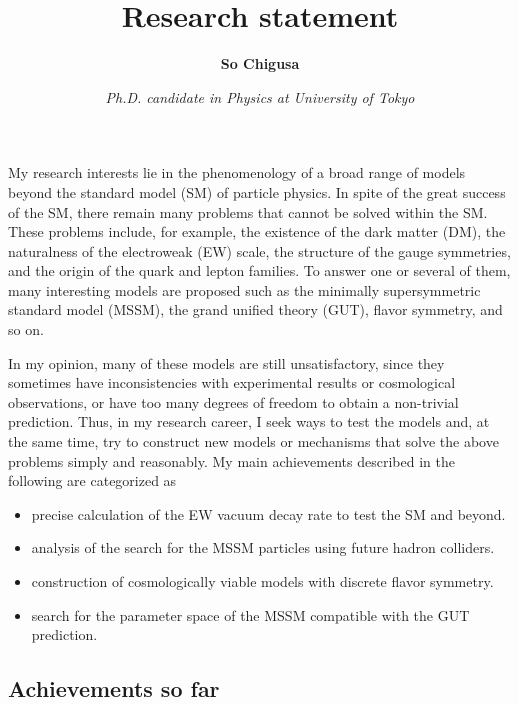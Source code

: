\documentclass[12pt,notitlepage]{article}
\title{\vspace*{-3cm}Research statement}
\author{\textbf{So Chigusa}}
\date{\vspace*{-4mm}\textit{Ph.D. candidate in Physics at University of Tokyo}}
\begin{document}
\maketitle

My research interests lie in the phenomenology of a broad range of models beyond the standard model (SM) of particle physics.
In spite of the great success of the SM, there remain many problems that cannot be solved within the SM.
These problems include, for example, the existence of the dark matter (DM), the naturalness of the electroweak (EW) scale, the structure of the gauge symmetries, and the origin of the quark and lepton families.
To answer one or several of them, many interesting models are proposed such as the minimally supersymmetric standard model (MSSM), the grand unified theory (GUT), flavor symmetry, and so on.

In my opinion, many of these models are still unsatisfactory, since they sometimes have inconsistencies with experimental results or cosmological observations, or have too many degrees of freedom to obtain a non-trivial prediction.
Thus, in my research career, I seek ways to test the models and, at the same time, try to construct new models or mechanisms that solve the above problems simply and reasonably.
My main achievements described in the following are categorized as
\vspace{-1.3mm}
\begin{itemize}
  \setlength{\parskip}{0mm}
  \setlength{\itemsep}{1mm}
  \item precise calculation of the EW vacuum decay rate to test the SM and beyond.
  \item analysis of the search for the MSSM particles using future hadron colliders.
  \item construction of cosmologically viable models with discrete flavor symmetry.
  \item search for the parameter space of the MSSM compatible with the GUT prediction.
\end{itemize}

\vspace*{-2mm}
\subsection*{Achievements so far}
\end{document}

